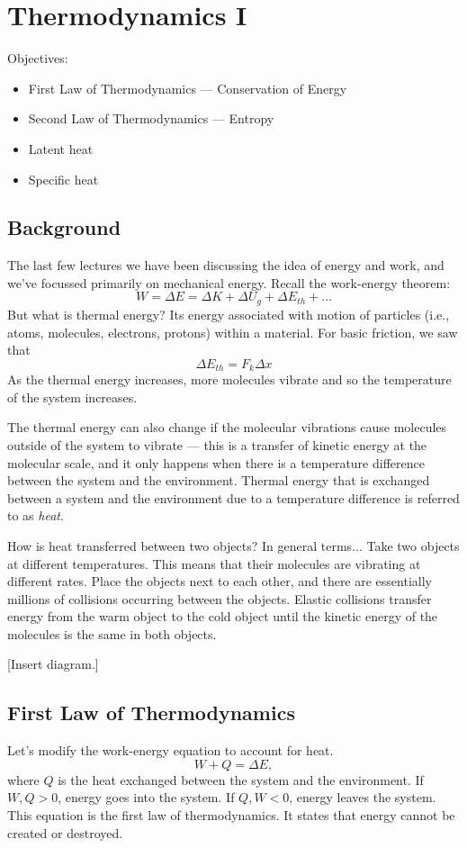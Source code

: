 \section{Thermodynamics I}
Objectives:
\begin{itemize}
\item First Law of Thermodynamics --- Conservation of Energy
\item Second Law of Thermodynamics --- Entropy
\item Latent heat
\item Specific heat
\end{itemize}

\subsection{Background}  
The last few lectures we have been discussing the idea of energy and work, and we've focussed primarily on mechanical energy. Recall the work-energy theorem:
$$W=\Delta{E}=\Delta{K}+\Delta{U_g}+\Delta{E_{th}}+...$$
But what is thermal energy? Its energy associated with motion of particles (i.e., atoms, molecules, electrons, protons) within a material. For basic friction, we saw that
$$\Delta{E_{th}}=F_k\Delta{x}$$
As the thermal energy increases, more molecules vibrate and so the temperature of the system increases.

The thermal energy can also change if the molecular vibrations cause molecules outside of the system to vibrate --- this is a transfer of kinetic energy at the molecular scale, and it only happens when there is a temperature difference between the system and the environment. Thermal energy that is exchanged between a system and the environment due to a temperature difference is referred to as \textit{heat}.

How is heat transferred between two objects? In general terms... Take two objects at different temperatures. This means that their molecules are vibrating at different rates. Place the objects next to each other, and there are essentially millions of collisions occurring between the objects. Elastic collisions transfer energy from the warm object to the cold object until the kinetic energy of the molecules is the same in both objects.

[Insert diagram.]
\vspace{5cm}

\subsection{First Law of Thermodynamics}
Let's modify the work-energy equation to account for heat.
$$W+Q=\Delta{E},$$
where $Q$ is the heat exchanged between the system and the environment. If $W,Q>0$, energy goes into the system. If $Q,W<0$, energy leaves the system. This equation is the first law of thermodynamics. It states that energy cannot be created or destroyed.

